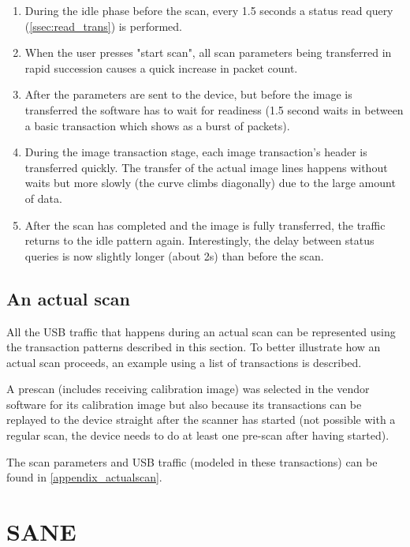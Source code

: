 \documentclass{article}
\begin{document}
\begin{enumerate}

\item During the idle phase before the scan, every 1.5 seconds a status read query
(\autoref{ssec:read_trans}) is performed.

\item When the user presses "start scan", all scan parameters being transferred
in rapid succession causes a quick increase in packet count.

\item After the parameters are sent to the device, but before the image is transferred
the software has to wait for readiness (1.5 second waits in between a basic transaction
which shows as a burst of packets).

\item During the image transaction stage, each image transaction's header is
transferred quickly. The transfer of the actual image lines happens without waits
but more slowly (the curve climbs diagonally) due to the large amount of data.

\item After the scan has completed and the image is fully transferred,
the traffic returns to the idle pattern again. Interestingly, the delay
between status queries is now slightly longer (about 2s) than before the scan.

\end{enumerate}

\subsection{An actual scan}
\label{ssec:actualscan}

All the USB traffic that happens during an actual scan can be represented
using the transaction patterns described in this section. To better illustrate
how an actual scan proceeds, an example using a list of transactions is described.

A prescan (includes receiving calibration image) was selected in the vendor software
for its calibration image but also because its transactions can be replayed
to the device straight after the scanner has started
(not possible with a regular scan, the device needs to do at least one pre-scan
after having started).

The scan parameters and USB traffic (modeled in these transactions) can be found
in \autoref{appendix_actualscan}.

\section{SANE}
\label{sec:sane}
\end{document}

